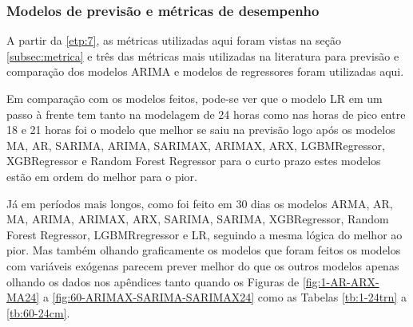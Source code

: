 \subsubsection{Modelos de previs\~ao e m\'etricas de desempenho}\label{subsubsec:modelos}

A partir da \ref{etp:7}, as métricas utilizadas aqui foram vistas na seção \ref{subsec:metrica} e três das métricas mais utilizadas na literatura para previsão e comparação dos modelos ARIMA e modelos de regressores foram utilizadas aqui.

Em comparação com os modelos feitos, pode-se ver que o modelo LR em um passo à frente tem tanto na modelagem de 24 horas como nas horas de pico entre 18 e 21 horas foi o modelo que melhor se saiu na previsão logo após os modelos MA, AR, SARIMA, ARIMA, SARIMAX, ARIMAX, ARX, LGBMRegressor, XGBRegressor e Random Forest Regressor para o curto prazo estes modelos estão em ordem do melhor para o pior.

Já em períodos mais longos, como foi feito em 30 dias os modelos ARMA, AR, MA, ARIMA, ARIMAX, ARX, SARIMA, SARIMA, XGBRegressor, Random Forest Regressor, LGBMRregressor e LR, seguindo a mesma lógica do melhor ao pior. Mas também olhando graficamente os modelos que foram feitos os modelos com variáveis exógenas parecem prever melhor do que os outros modelos apenas olhando os dados nos apêndices tanto quando os Figuras de \ref{fig:1-AR-ARX-MA24} a \ref{fig:60-ARIMAX-SARIMA-SARIMAX24} como as Tabelas \ref{tb:1-24trn} a \ref{tb:60-24cm}.   
